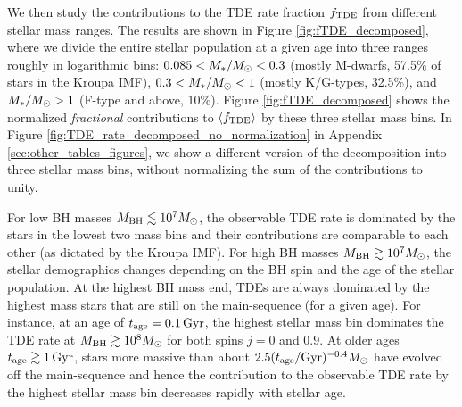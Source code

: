 \documentclass[useAMS,usenatbib]{mn2e}
\def\mr{\mathrm}
\def\msun{M_{\rm \odot}}
\def\mstar{M_*}
\def\mBH{M_{\rm BH}}
\def\GammaTDE{\Gamma_{\rm TDE}}
\def\fTDE{f_{\rm TDE}}
\def\tage{t_{\rm age}}
\def\Gyr{{\rm Gyr}}
\newcommand{\lara}[1]{\left\langle{#1}\right\rangle}
\begin{document}
We then study the contributions to the TDE rate fraction $\fTDE$ from different stellar mass ranges. The results are shown in Figure \ref{fig:fTDE_decomposed}, where we divide the entire stellar population at a given age into three ranges roughly in logarithmic bins: $0.085<\mstar/\msun < 0.3$ (mostly M-dwarfs, 57.5\% of stars in the Kroupa IMF), $0.3<\mstar/\msun < 1$ (mostly K/G-types, 32.5\%), and $\mstar/\msun > 1$ (F-type and above, 10\%). Figure \ref{fig:fTDE_decomposed} shows the normalized \textit{fractional} contributions to $\lara{\fTDE}$ by these three stellar mass bins. In Figure \ref{fig:TDE_rate_decomposed_no_normalization} in Appendix \ref{sec:other_tables_figures}, we show a different version of the decomposition into three stellar mass bins, without normalizing the sum of the contributions to unity.

For low BH masses $\mBH\lesssim 10^7\msun$, the observable TDE rate is dominated by the stars in the lowest two mass bins and their contributions are comparable to each other (as dictated by the Kroupa IMF). For high BH masses $\mBH\gtrsim 10^7\msun$, the stellar demographics changes depending on the BH spin and the age of the stellar population. At the highest BH mass end, TDEs are always dominated by the highest mass stars that are still on the main-sequence (for a given age). For instance, at an age of $\tage=0.1\rm\, Gyr$, the highest stellar mass bin dominates the TDE rate at $\mBH\gtrsim 10^8\msun$ for both spins $j=0$ and $0.9$. At older ages $\tage\gtrsim 1\rm\, Gyr$, stars more massive than about $2.5(\tage/\mr{Gyr})^{-0.4}\msun$ have evolved off the main-sequence and hence the contribution to the observable TDE rate by the highest stellar mass bin decreases rapidly with stellar age. 

\end{document}
